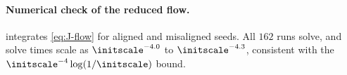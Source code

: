 \paragraph{Numerical check of the reduced flow.}  integrates \cref{eq:J-flow} for aligned and misaligned seeds.
All $162$ runs solve, and solve times scale as $\initscale^{-4.0}$ to $\initscale^{-4.3}$, consistent with the $\initscale^{-4}\log(1/\initscale)$ bound.



